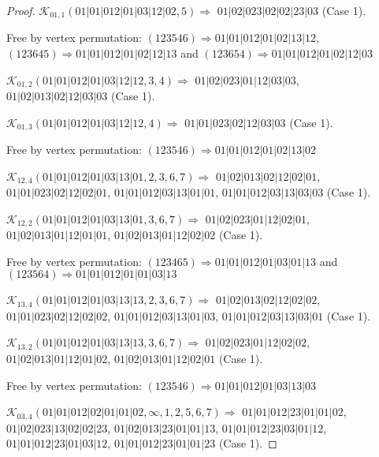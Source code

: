 \documentclass[12pt]{article}
\theoremstyle{plain}
\theoremstyle{definition}
\theoremstyle{remark}
\newcommand{\fancy}[1]{\mathcal{#1}}
\def\K{\fancy{K}}
\begin{document}
\begin{proof}
	$\K_{01,1}(01|01|012|01|03|12|02,5)\Rightarrow $ $01|02|023|02|02|23|03$ (Case 1).
	
	
	
	Free by vertex permutation: $(1 2 3 5 4 6)\Rightarrow 01|01|012|01|02|13|12$, $(1 2 3 6 4 5)\Rightarrow 01|01|012|01|02|12|13$ and $(1 2 3 6 5 4)\Rightarrow 01|01|012|01|02|12|03$
	
	
	
	\bigskip
	
	$\K_{01,2}(01|01|012|01|03|12|12,3, 4)\Rightarrow $ $01|02|023|01|12|03|03$, $01|02|013|02|12|03|03$ (Case 1).
	
	$\K_{01,3}(01|01|012|01|03|12|12,4)\Rightarrow $ $01|01|023|02|12|03|03$ (Case 1).
	
	
	
	Free by vertex permutation: $(1 2 3 5 4 6)\Rightarrow 01|01|012|01|02|13|02$
	
	
	
	\bigskip
	
	$\K_{12,4}(01|01|012|01|03|13|01,2, 3, 6, 7)\Rightarrow $ $01|02|013|02|12|02|01$, $01|01|023|02|12|02|01$, $01|01|012|03|13|01|01$, $01|01|012|03|13|03|03$ (Case 1).
	
	$\K_{12,2}(01|01|012|01|03|13|01,3, 6, 7)\Rightarrow $ $01|02|023|01|12|02|01$, $01|02|013|01|12|01|01$, $01|02|013|01|12|02|02$ (Case 1).
	
	
	
	Free by vertex permutation: $(1 2 3 4 6 5)\Rightarrow 01|01|012|01|03|01|13$ and $(1 2 3 5 6 4)\Rightarrow 01|01|012|01|01|03|13$
	
	
	
	\bigskip
	
	$\K_{13,4}(01|01|012|01|03|13|13,2, 3, 6, 7)\Rightarrow $ $01|02|013|02|12|02|02$, $01|01|023|02|12|02|02$, $01|01|012|03|13|01|03$, $01|01|012|03|13|03|01$ (Case 1).
	
	$\K_{13,2}(01|01|012|01|03|13|13,3, 6, 7)\Rightarrow $ $01|02|023|01|12|02|02$, $01|02|013|01|12|01|02$, $01|02|013|01|12|02|01$ (Case 1).
	
	
	
	Free by vertex permutation: $(1 2 3 5 4 6)\Rightarrow 01|01|012|01|03|13|03$
	
	
	
	\bigskip
	
	$\K_{03,4}(01|01|012|02|01|01|02,\infty,1, 2, 5, 6, 7)\Rightarrow $ $01|01|012|23|01|01|02$, $01|02|023|13|02|02|23$, $01|02|013|23|01|01|13$, $01|01|012|23|03|01|12$, $01|01|012|23|01|03|12$, $01|01|012|23|01|01|23$ (Case 1).
	

\end{proof}
\end{document}
